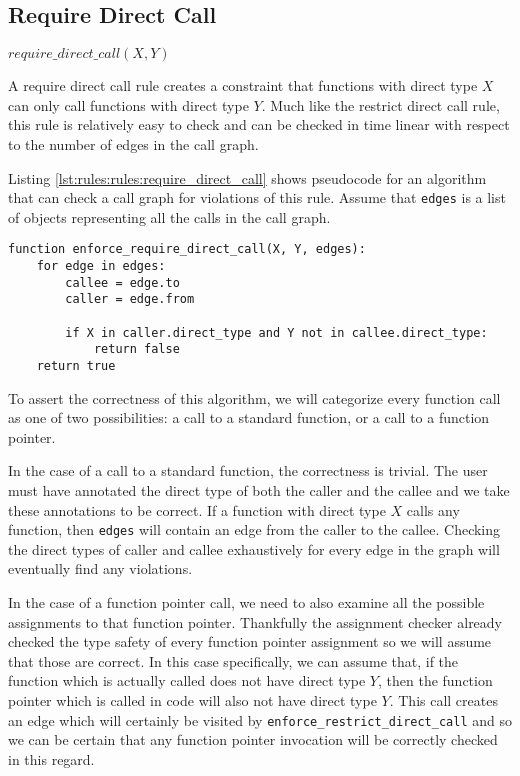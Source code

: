 \subsection{Require Direct Call}

\begin{center}
    $require\_direct\_call(X, Y)$
\end{center}

A require direct call rule creates a constraint that functions with direct type $X$ can only call functions with direct type $Y$. Much like the restrict direct call rule, this rule is relatively easy to check and can be checked in time linear with respect to the number of edges in the call graph.

Listing \ref{lst:rules:rules:require_direct_call} shows pseudocode for an algorithm that can check a call graph for violations of this rule.  Assume that \lstinline{edges} is a list of objects representing all the calls in the call graph.  

\noindent\begin{minipage}[t]{\linewidth}
\begin{lstlisting}[caption={Pseudocode for an algorithm that can check a $require\_direct\_call$ constraint.  This algorithm returns \lstinline{true} if the call graph respects the constraint and \lstinline{false} if the call graph violates it.},label={lst:rules:rules:require_direct_call}]
function enforce_require_direct_call(X, Y, edges):
    for edge in edges:
        callee = edge.to
        caller = edge.from

        if X in caller.direct_type and Y not in callee.direct_type:
            return false
    return true
\end{lstlisting}
\end{minipage}

To assert the correctness of this algorithm, we will categorize every function call as one of two possibilities: a call to a standard function, or a call to a function pointer.

In the case of a call to a standard function, the correctness is trivial.  The user must have annotated the direct type of both the caller and the callee and we take these annotations to be correct.  If a function with direct type $X$ calls any function, then \lstinline{edges} will contain an edge from the caller to the callee.  Checking the direct types of caller and callee exhaustively for every edge in the graph will eventually find any violations.

In the case of a function pointer call, we need to also examine all the possible assignments to that function pointer.  Thankfully the assignment checker already checked the type safety of every function pointer assignment so we will assume that those are correct.  In this case specifically, we can assume that, if the function which is actually called does not have direct type $Y$, then the function pointer which is called in code will also not have direct type $Y$.  This call creates an edge which will certainly be visited by \lstinline{enforce_restrict_direct_call} and so we can be certain that any function pointer invocation will be correctly checked in this regard.

